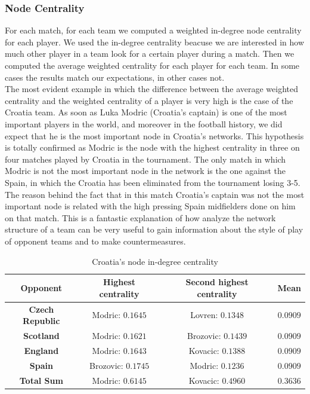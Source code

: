 \documentclass[12pt, a4paper]{article}
\begin{document}
\subsubsection{Node Centrality}
For each match, for each team we computed a weighted in-degree node centrality for each player. We used the in-degree centrality beacuse we are interested in how much other player in a team look for a certain player during a match. Then we computed the average weighted centrality for each player for each team. In some cases the results match our expectations, in other cases not. \\
The most evident example in which the difference between the average weighted centrality and the weighted centrality of a player is very high is the case of the Croatia team. As soon as Luka Modric (Croatia's captain) is one of the most important players in the world, and moreover in the football history, we did expect that he is the most important node in Croatia's networks. This hypothesis is totally confirmed as Modric is the node with the highest centrality in three on four matches played by Croatia in the tournament. The only match in which Modric is not the most important node in the network is the one against the Spain, in which the Croatia has been eliminated from the tournament losing 3-5. The reason behind the fact that in this match Croatia's captain was not the most important node is related with the high pressing Spain midfielders done on him on that match. This is a fantastic explanation of how analyze the network structure of a team can be very useful to gain information about the style of play of opponent teams and to make countermeasures.  \\ 

\begin{table}[H]
    \centering
    \begin{tabular}{|c|c|c|c|}
            \hline
            \textbf{Opponent} &  \textbf{Highest centrality} &  \textbf{Second highest centrality} &  \textbf{Mean} \\
            \hline
            \textbf{Czech Republic} &  Modric: $0.1645$ & Lovren: $0.1348$ & $0.0909$ \\
            \hline
            \textbf{ Scotland} &  Modric: $0.1621$ & Brozovic: $0.1439$ & $0.0909$ \\
            \hline
            \textbf{England} &  Modric: $0.1643$ & Kovacic: $0.1388$ & $0.0909$ \\
            \hline
            \textbf{Spain} &  Brozovic: $0.1745$ & Modric: $0.1236$ & $0.0909$ \\
            \hline
            \textbf{Total Sum} &  Modric: $0.6145$ & Kovacic: $0.4960$ & $0.3636$ \\
            \hline
    \end{tabular}
    \caption{Croatia's node in-degree centrality}
\end{table}
\end{document}
